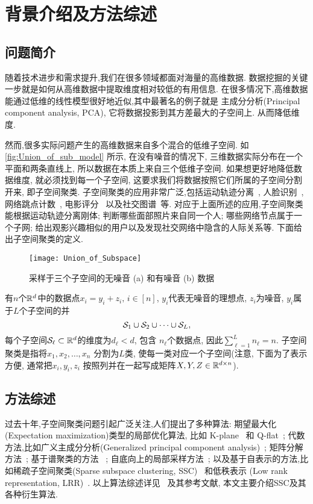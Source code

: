 \chapter{背景介绍及方法综述}\label{chp:intro}
\section{问题简介}
随着技术进步和需求提升,我们在很多领域都面对海量的高维数据. 
数据挖掘的关键一步就是如何从高维数据中提取维度相对较低的有用信息.
在很多情况下,高维数据能通过低维的线性模型很好地近似,其中最著名的例子就是
主成分分析(Principal component analysis, PCA), 它将数据投影到其方差最大的子空间上.
从而降低维度.

然而,很多实际问题产生的高维数据来自多个混合的低维子空间.
如\autoref{fig:Union_of_sub_model} 所示, 在没有噪音的情况下,
三维数据实际分布在一个平面和两条直线上,
所以数据在本质上来自三个低维子空间.
如果想更好地降低数据维度, 就必须找到每一个子空间,
这要求我们将数据按照它们所属的子空间分割开来, 即子空间聚类.
子空间聚类的应用非常广泛,包括运动轨迹分离~\cite{costeira1998multibody},
人脸识别~\cite{basri2003lambertian},网络跳点计数~\cite{eriksson2011high},
电影评分~\cite{zhang2012guess} 以及社交图谱~\cite{chen2014clustering}等.
对应于上面所述的应用,子空间聚类能根据运动轨迹分离刚体;
判断哪些面部照片来自同一个人; 哪些网络节点属于一个子网;
给出观影兴趣相似的用户以及发现社交网络中隐含的人际关系等.
下面给出子空间聚类的定义.
\begin{figure}[tb]
  \centering
  \texttt{[image: Union\_of\_Subspace]}
  \caption{采样于三个子空间的无噪音 (a) 和有噪音 (b) 数据}\label{fig:Union_of_sub_model}
\end{figure}
\begin{definition}\label{def:sc}
  有\(n\)个\(\mathbb{R}^d\)中的数据点\(x_i = y_i+z_i, \, i \in [n]\),
  \(y_i\)代表无噪音的理想点, \(z_i\)为噪音, \(y_i\)属于\(L\)个子空间的并
  \[\mathcal{S}_1 \cup \mathcal{S}_2 \cup\cdots\cup \mathcal{S}_L,\]
  每个子空间\(\mathcal{S}_\ell \subset \mathbb{R}^d\)的维度为\(d_{\ell} < d\),
  包含 \(n_{\ell}\)个数据点, 因此\(\sum_{\ell=1}^L n_\ell=n\). 
  子空间聚类是指将\(x_1, x_2, \ldots, x_n\) 分割为\(L\)类,
  使每一类对应一个子空间(注意, 下面为了表示方便, 通常把\(x_i, y_i, z_i\)
  按照列并在一起写成矩阵\(X, Y, Z\in \mathbb{R}^{d\times n}\)).
\end{definition}
\section{方法综述}
过去十年,子空间聚类问题引起广泛关注,人们提出了多种算法:
期望最大化(Expectation maximization)类型的局部优化算法,
比如 K-plane~\cite{bradley2000k} 和 Q-flat~\cite{tseng2000nearest};
代数方法,比如广义主成分分析(Generalized principal component analysis)~\cite{vidal2005generalized};
矩阵分解方法~\cite{costeira1995multi,costeira1998multibody}; 基于谱聚类的方法
~\cite{chen2009spectral,lauer2009spectral}; 自底向上的局部采样方法~\cite{rao2008motion,yan2006general};
以及基于自表示的方法,比如稀疏子空间聚类(Sparse subspace clustering, SSC)~\cite{elhamifar2009sparse,elhamifar2013sparse}
和低秩表示 (Low rank representation, LRR)~\cite{liu2010robust,liu2013robust}.
以上算法综述详见~\cite{vidal2010tutorial} 及其参考文献,
本文主要介绍SSC及其各种衍生算法.

